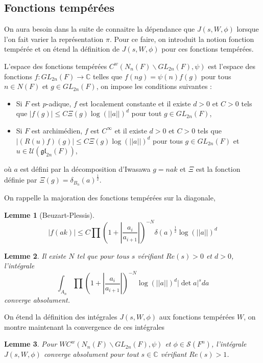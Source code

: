 \documentclass{amsart}
\newtheorem{lemme}{Lemme}[section]
\begin{document}
 \subsection{Fonctions tempérées}
 On aura besoin dans la suite de connaitre la dépendance que $J(s, W, \phi)$ lorsque l'on fait varier la représentation $\pi$. Pour ce faire, on introduit la notion fonction tempérée et on étend la définition de $J(s,W,\phi)$ pour ces fonctions tempérées.
 
 L'espace des fonctions tempérées $C^w(N_n(F)\backslash{GL_{2n}(F)}, \psi)$ est l'espace des fonctions $f : GL_{2n}(F) \rightarrow \mathbb{C}$ telles que $f(ng) = \psi(n)f(g)$ pour tous $n \in N(F)$ et $g \in GL_{2n}(F)$, on impose les conditions suivantes :
 \begin{itemize}
 \item Si $F$ est $p$-adique, $f$ est localement constante et il existe $d > 0$ et $C > 0$ tels que $|f(g)| \leq C \Xi(g)\log(||a||)^d$ pour tout $g \in GL_{2n}(F)$,
 \item Si $F$ est archimédien, $f$ est $C^\infty$ et il existe $d > 0$ et $C > 0$ tels que $|(R(u)f)(g)| \leq C \Xi(g) \log(||a||)^d$ pour tous $g \in GL_{2n}(F)$ et $u \in \mathcal{U}(\mathfrak{gl}_{2n}(F))$,
 \end{itemize}
 où $a$ est défini par la décomposition d'Iwasawa $g=nak$ et $\Xi$ est la fonction définie par $\Xi(g) = \delta_{B_n}(a)^{\frac{1}{2}}$.
 
On rappelle la majoration des fonctions tempérées sur la diagonale,
\begin{lemme}[Beuzart-Plessis]
\label{majtemp}
\begin{equation}
|f(ak)| \leq C\prod (1 + |\frac{a_i}{a_{i+1}}|)^{-N}\delta(a)^{\frac{1}{2}}\log(||a||)^d
\end{equation}
\end{lemme}

\begin{lemme}
Il existe $N$ tel que pour tous $s$ vérifiant $Re(s) > 0$ et $d > 0$, l'intégrale
\begin{equation}
\int_{A_n} \prod (1+|\frac{a_i}{a_{i+1}}|)^{-N}\log(||a||)^d|\det a|^s da
\end{equation}
converge absolument.
\end{lemme}

On étend la définition des intégrales $J(s, W, \phi)$ aux fonctions tempérées $W$, on montre maintenant la convergence de ces intégrales
\begin{lemme}
Pour $W C^w(N_n(F)\backslash{GL_{2n}(F)}, \psi)$ et $\phi \in \mathcal{S}(F^n)$, l'intégrale $J(s, W, \phi)$ converge absolument pour tout $s \in \mathbb{C}$ vérifiant $Re(s) > 1$.
\end{lemme}
 
\end{document}
